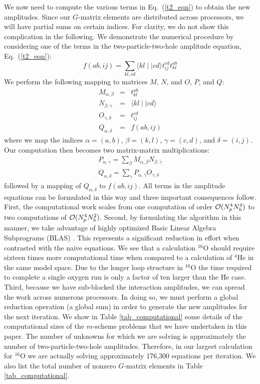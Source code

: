 We now need to compute the various terms in Eq.~(\ref{t2_eqn}) to obtain
the new amplitudes. Since our $G$-matrix elements are distributed across
processors, we will have partial sums on certain indices. For clarity,
we do not show this complication in the following. 
We demonstrate the numerical procedure by considering one of the terms
in the two-particle-two-hole amplitude equation, Eq.~(\ref{t2_eqn}):
\begin{equation}
f(ab,ij)= \sum_{kl,cd} \langle kl \mid \mid cd \rangle t^{cd}_{ij}t^{ab}_{kl}
\end{equation}
We perform the following mapping to matrices $M$, $N$, and $O$, $P$, and $Q$:
\begin{eqnarray}
M_{\alpha,\beta} &=& t^{ab}_{kl} \nonumber \\
N_{\beta,\gamma} &=& \langle k l \mid\mid cd \rangle \nonumber \\
O_{\gamma,\delta}&=& t^{cd}_{ij}  \nonumber \\
Q_{\alpha,\delta}&=& f(ab,ij)
\end{eqnarray}
where we map the indices $\alpha=(a,b)$, $\beta=(k,l)$, $\gamma=(c,d)$, and
$\delta=(i,j)$. Our computation then becomes two matrix-matrix multiplications:
\begin{eqnarray}
P_{\alpha,\gamma}=\sum_{\beta}  M_{\alpha,\beta} N_{\beta,\gamma} \nonumber \\
Q_{\alpha,\delta}=\sum_{\gamma} P_{\alpha,\gamma}O_{\gamma,\delta}
\end{eqnarray}
followed by a mapping of $Q_{\alpha,\delta}$ to $f(ab,ij)$. 
All terms in the amplitude equations can be formulated
in this way and three important consequences follow. 
First, the computational work 
scales from one computation of order ${\cal O}(N_p^4 N_h^4)$ to two computations
of ${\cal O}(N_p^4 N_h^2)$. Second, by formulating the algorithm in this 
manner, we take advantage of highly optimized Basic Linear Algebra 
Subprograms (BLAS) \cite{blas}.  
This represents a significant reduction in effort when
contrasted with the naive equations. We see that a calculation $^{16}$O 
should require sixteen times more computational time when compared to a
calculation of $^{4}$He in the same model space. Due to the longer loop
structure in $^{16}$O the time required to complete a single oxygen run is
only a factor of ten larger than the He case. 
Third, because we have sub-blocked the interaction amplitudes, we 
can spread the work across numerous processors. In doing so, we must 
perform a global reduction operation (a global sum) in order to 
generate the new amplitudes for the next iteration. 
We show in Table \ref{tab_computational}
some details of the computational sizes of the $m$-scheme problems 
that we have undertaken in this paper. The number of unknowns for
which we are solving is approximately the number of two-particle-two-hole
amplitudes. Therefore, in our largest calculation for $^{16}$O we 
are actually solving approximately 176,300 equations per iteration. 
We also list the total number of nonzero $G$-matrix elements in Table 
\ref{tab_computational}.

